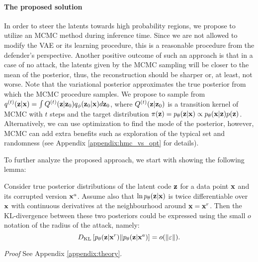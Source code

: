 \paragraph{The proposed solution } In order to steer the latents towards high probability regions, we propose to utilize an MCMC method during inference time. 
Since we are not allowed to modify the VAE or its learning procedure, this is a reasonable procedure from the defender's perspective. 
Another positive outcome of such an approach is that in a case of no attack, the latents given by the MCMC sampling will be closer to the mean of the posterior, thus, the reconstruction should be sharper or, at least, not worse. 
Note that the variational posterior approximates the true posterior from which the MCMC procedure samples. 
We propose to sample from $q^{(t)}({\mathbf{z}}|{\mathbf{x}}) = \int Q^{(t)}({\mathbf{z}}|{\mathbf{z}}_0) q_{\phi}({\mathbf{z}}_0|{\mathbf{x}}) d{\mathbf{z}}_0$, where $Q^{(t)}({\mathbf{z}}|{\mathbf{z}}_0)$ is a transition kernel of MCMC with $t$ steps and the target distribution $\pi({\mathbf{z}}) = p_{\theta}({\mathbf{z}}|{\mathbf{x}}) \propto p_{\theta}({\mathbf{x}}|{\mathbf{z}})p({\mathbf{z}})$. 
Alternatively, we can use optimization to find the mode of the posterior, however, MCMC can add extra benefits such as exploration of the typical set and randomness (see Appendix \ref{appendix:hmc_vs_opt} for details).

To further analyze the proposed approach, we start with showing the following lemma:

\begin{lemma}\label{lemma:1}
Consider true posterior distributions of the latent code ${\mathbf{z}}$ for a data point ${\mathbf{x}}$ and its corrupted version ${\mathbf{x}}^a$.  
Assume also that $\ln p_{\theta}({\mathbf{z}}|{\mathbf{x}})$ is twice differentiable  over ${\mathbf{x}}$ with continuous derivatives at the neighbourhood around ${\mathbf{x}}={\mathbf{x}}^r$. 
Then the KL-divergence between these two posteriors could be expressed using the small $o$ notation of the radius of the attack, namely:
\begin{equation}
     D_{\mathrm{KL}}\left[ p_{\theta}({\mathbf{z}}|{\mathbf{x}}^r)\|p_{\theta}({\mathbf{z}}|{\mathbf{x}}^a)\right] = o(\|\varepsilon\|).
\end{equation}
\end{lemma}
\textit{Proof} See Appendix \ref{appendix:theory}.

